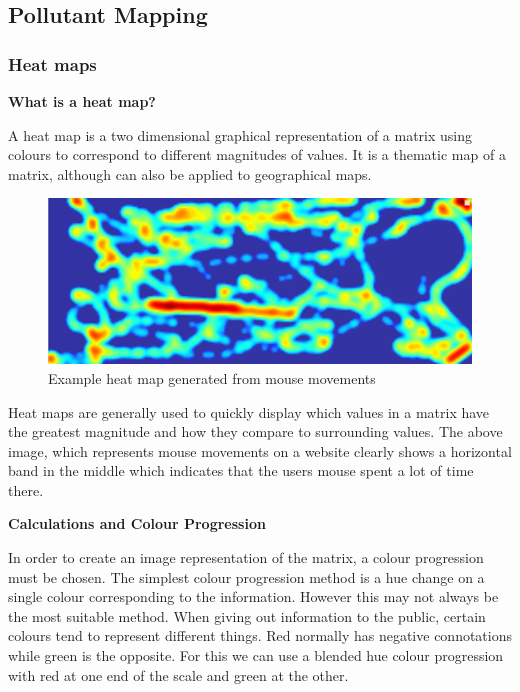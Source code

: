 \subsection{Pollutant Mapping}\label{pollutantmapping}

\subsubsection{Heat maps}\label{heatmaps}

\textbf{What is a heat map?}

A heat map is a two dimensional graphical representation of a matrix using colours to correspond to different magnitudes of values. It is a thematic map of a matrix, although can also be applied to geographical maps. 

\begin{figure}[H]
        \begin{center}
                \includegraphics[scale=0.5]{./images/heatmaps/ExampleMouseMove.png}
                \caption{Example heat map generated from mouse movements}
        \end{center}
\end{figure}

Heat maps are generally used to quickly display which values in a matrix have the greatest magnitude and how they compare to surrounding values. The above image, which represents mouse movements on a website clearly shows a horizontal band in the middle which indicates that the users mouse spent a lot of time there. 

\textbf{Calculations and Colour Progression}

In order to create an image representation of the matrix, a colour progression must be chosen. The simplest colour progression method is a hue change on a single colour corresponding to the information. However this may not always be the most suitable method. When giving out information to the public, certain colours tend to represent different things. Red normally has negative connotations while green is the opposite. For this we can use a blended hue colour progression with red at one end of the scale and green at the other.


